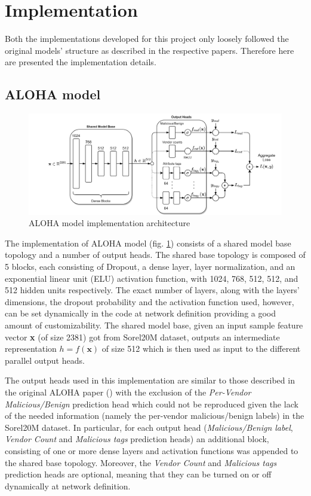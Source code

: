\documentclass[pdfa%
,cucitura%
]{toptesi}
\begin{document}
\section{Implementation}
Both the implementations developed for this project only loosely followed the original models' structure as described in the respective papers. Therefore here are presented the implementation details.

\subsection{ALOHA model}\label{sec:alohaModelImplementation}
\begin{figure}[h]
	\centering
	\includegraphics[width=\textwidth]{./images/ALOHA_Implementation.png}
	\caption[ALOHA model implementation architecture]{ALOHA model implementation architecture}
	\label{fig:ALOHA_Implementation_model}
\end{figure}

The implementation of ALOHA model (fig. \ref{fig:ALOHA_Implementation_model}) consists of a shared model base topology and a number of output heads. The shared base topology is composed of 5 blocks, each consisting of Dropout, a dense layer, layer normalization, and an exponential linear unit (ELU) activation function, with 1024, 768, 512, 512, and 512 hidden units respectively. The exact number of layers, along with the layers' dimensions, the dropout probability and the activation function used, however, can be set dynamically in the code at network definition providing a good amount of customizability. The shared model base, given an input sample feature vector \textbf{x} (of size 2381) got from Sorel20M dataset, outputs an intermediate representation $h=f(\textbf{x})$ of size 512 which is then used as input to the different parallel output heads.

The output heads used in this implementation are similar to those described in the original ALOHA paper (\cite{ruddALOHA}) with the exclusion of the \textit{Per-Vendor Malicious/Benign} prediction head which could not be reproduced given the lack of the needed information (namely the per-vendor malicious/benign labels) in the Sorel20M dataset. In particular, for each output head (\textit{Malicious/Benign label}, \textit{Vendor Count} and \textit{Malicious tags} prediction heads) an additional block, consisting of one or more dense layers and activation functions was appended to the shared base topology. Moreover, the \textit{Vendor Count} and \textit{Malicious tags} prediction heads are optional, meaning that they can be turned on or off dynamically at network definition.
\end{document}
